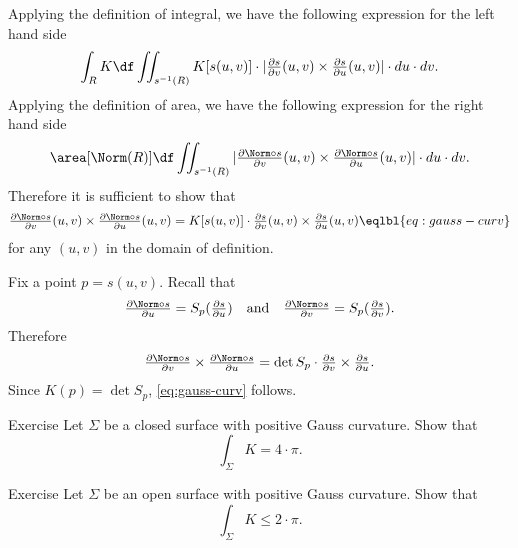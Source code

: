 Applying the definition of integral, we have the following expression for the left hand side
\[\int_R K \df \iint_{s^{-1}(R)} K[s(u,v)]\cdot |\tfrac{\partial s}{\partial v}(u,v)\times\tfrac{\partial s}{\partial u}(u,v)|  \cdot du\cdot dv.\]
Applying the definition of area, we have the following expression for the right hand side
\[\area[\Norm(R)] \df \iint_{s^{-1}(R)}  |\tfrac{\partial \Norm\circ s}{\partial v}(u,v)\times\tfrac{\partial \Norm\circ s}{\partial u}(u,v)|  \cdot du\cdot dv.\]
Therefore it is sufficient to show that 
\[\tfrac{\partial \Norm\circ s}{\partial v}(u,v)\times\tfrac{\partial \Norm\circ s}{\partial u}(u,v)=K[s(u,v)]\cdot \tfrac{\partial s}{\partial v}(u,v)\times\tfrac{\partial s}{\partial u}(u,v)\eqlbl{eq:gauss-curv}\]
for any $(u,v)$ in the domain of definition. 

Fix a point $p=s(u,v)$.
Recall that 
\[\tfrac{\partial \Norm\circ s}{\partial u}=S_p(\tfrac{\partial  s}{\partial u})\quad\text{and}\quad\tfrac{\partial \Norm\circ s}{\partial v}=S_p(\tfrac{\partial  s}{\partial v}).\]
Therefore 
\[\tfrac{\partial \Norm\circ s}{\partial v}\times\tfrac{\partial \Norm\circ s}{\partial u}=\det S_p\cdot \tfrac{\partial s}{\partial v}\times\tfrac{\partial s}{\partial u}.\]
Since $K(p)=\det S_p$, \ref{eq:gauss-curv} follows.
\qeds

\begin{thm}{Exercise}\label{ex:int-gauss=4pi}
Let $\Sigma$ be a closed surface with positive Gauss curvature.
Show that 
\[\int_\Sigma K=4\cdot\pi.\]

\end{thm}

\begin{thm}{Exercise}\label{ex:gauss-integral-open}
Let $\Sigma$ be an open surface with positive Gauss curvature.
Show that 
\[\int_\Sigma K\le 2\cdot\pi.\]

\end{thm}































